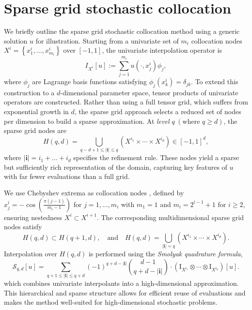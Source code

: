 \section{Sparse grid stochastic collocation}\label{sec:SC}
We briefly outline the sparse grid stochastic collocation method \cite{BaNoRi:2000, KlBa:2005, MaNi:2009, Sm:1963} using a generic solution $u$ for illustration. Starting from a univariate set of $m_i$ collocation nodes $X^i = \left\{x_1^i,\ldots, x_{m_i}^i\right\}$ over $[-1,1]$, the univariate interpolation operator is
%
\[
I_{X^{i}}[u]:=\sum_{j=1}^{m_{i}} u(\cdot, x_j^i)\phi_j,
\]
%
where $\phi_j$ are Lagrange basis functions satisfying $\phi_j(x_k^i) = \delta_{jk}$. To extend this construction to a $d$-dimensional parameter space,  tensor products of univariate operators are constructed. Rather than using a full tensor grid, which suffers from exponential growth in $d$, the sparse grid approach selects a reduced set of nodes per dimension to build a sparse approximation. At {\it level} $q\; (\text{where }q\ge d)$, the sparse grid nodes are
%
\begin{equation*}
H(q,d) = \bigcup_{q-d+1\le|\boldsymbol{i}|\le q} \left(X^{i_1}\times \cdots\times X^{i_d}\right)\in [-1,1]^d, 
\end{equation*}
%
where $|\boldsymbol{i}| = i_1+\ldots+i_d$ specifies the refinement rule. These nodes yield a sparse but sufficiently rich representation of the domain, capturing key features of $u$ with far fewer evaluations than a full grid.

We use Chebyshev extrema as collocation nodes \cite{BaNoRi:2000, ClCu:1960}, defined by $x_j^i=-\cos(\frac{ \pi(j-1)}{m_i-1})$ for $j=1, \ldots, m_i$ with $m_1 =1$ and $m_i = 2^{i-1}+1$ for $i\ge 2$, ensuring nestedness $X^i\subset X^{i+1}$. The corresponding multidimensional sparse grid nodes satisfy 
%
\begin{equation}
\label{eq:NestedColPts}
H(q,d)\subset H(q+1,d),\quad \text{and}\quad H(q,d) = \bigcup_{|\boldsymbol{i}|=q} \left(X^{i_1}\times \cdots\times X^{i_d}\right).
\end{equation}
%
Interpolation over $H(q,d)$  is performed using the {\it Smolyak quadrature formula}, 
%
\begin{equation}
\label{eq: Smolyak_Quad_formula}
\mathcal{S}_{q, d}[u] = \sum_{q+1\le |\boldsymbol{i}|\le q+d} (-1)^{q+d-|\boldsymbol{i}|} \binom{d-1}{q+d-|\boldsymbol{i}|}\cdot \left(\mathrm I_{X^{i_1}}\otimes\cdots\otimes \mathrm I_{X^{i_d}}\right) [u].
\end{equation} 
%
which combines univariate interpolants into a high-dimensional approximation. This hierarchical and sparse structure allows for efficient reuse of evaluations and makes the method well-suited for high-dimensional stochastic problems.


